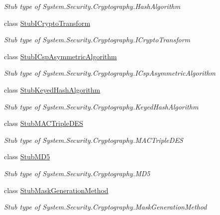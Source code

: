 \begin{DoxyCompactItemize}
\begin{DoxyCompactList}\small\item\em Stub type of System.\-Security.\-Cryptography.\-Hash\-Algorithm\end{DoxyCompactList}\item 
class \hyperlink{class_system_1_1_security_1_1_cryptography_1_1_fakes_1_1_stub_i_crypto_transform}{Stub\-I\-Crypto\-Transform}
\begin{DoxyCompactList}\small\item\em Stub type of System.\-Security.\-Cryptography.\-I\-Crypto\-Transform\end{DoxyCompactList}\item 
class \hyperlink{class_system_1_1_security_1_1_cryptography_1_1_fakes_1_1_stub_i_csp_asymmetric_algorithm}{Stub\-I\-Csp\-Asymmetric\-Algorithm}
\begin{DoxyCompactList}\small\item\em Stub type of System.\-Security.\-Cryptography.\-I\-Csp\-Asymmetric\-Algorithm\end{DoxyCompactList}\item 
class \hyperlink{class_system_1_1_security_1_1_cryptography_1_1_fakes_1_1_stub_keyed_hash_algorithm}{Stub\-Keyed\-Hash\-Algorithm}
\begin{DoxyCompactList}\small\item\em Stub type of System.\-Security.\-Cryptography.\-Keyed\-Hash\-Algorithm\end{DoxyCompactList}\item 
class \hyperlink{class_system_1_1_security_1_1_cryptography_1_1_fakes_1_1_stub_m_a_c_triple_d_e_s}{Stub\-M\-A\-C\-Triple\-D\-E\-S}
\begin{DoxyCompactList}\small\item\em Stub type of System.\-Security.\-Cryptography.\-M\-A\-C\-Triple\-D\-E\-S\end{DoxyCompactList}\item 
class \hyperlink{class_system_1_1_security_1_1_cryptography_1_1_fakes_1_1_stub_m_d5}{Stub\-M\-D5}
\begin{DoxyCompactList}\small\item\em Stub type of System.\-Security.\-Cryptography.\-M\-D5\end{DoxyCompactList}\item 
class \hyperlink{class_system_1_1_security_1_1_cryptography_1_1_fakes_1_1_stub_mask_generation_method}{Stub\-Mask\-Generation\-Method}
\begin{DoxyCompactList}\small\item\em Stub type of System.\-Security.\-Cryptography.\-Mask\-Generation\-Method\end{DoxyCompactList}\item 

\end{DoxyCompactItemize}
